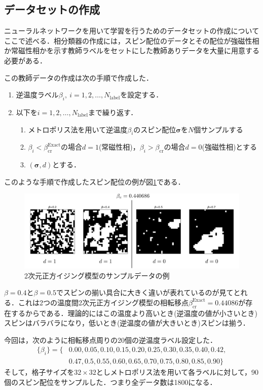 \documentclass[a4paper,11pt]{jsreport}
\begin{document}
\subsection{データセットの作成}
ニューラルネットワークを用いて学習を行うためのデータセットの作成についてここで述べる．相分類器の作成には，スピン配位のデータとその配位が強磁性相か常磁性相かを示す教師ラベルをセットにした教師ありデータを大量に用意する必要がある．\par
この教師データの作成は次の手順で作成した．
\begin{enumerate}
  \item 逆温度ラベル$\beta_i, \ i=1,2,\dots,N_{\text{label}}$を設定する．
  \item 以下を$i=1,2,\dots,N_{\text{label}}$まで繰り返す．
  \begin{enumerate}
    \item メトロポリス法を用いて逆温度$\beta_i$のスピン配位$\bm{\sigma}$を$N$個サンプルする
    \item $\beta_i<\beta_{\text{cr}}^{\text{Exact}}$の場合$d=1$(常磁性相)，$\beta_i>\beta_{\text{cr}}$の場合$d=0$(強磁性相)とする
    \item $(\bm{\sigma},d)$とする．
  \end{enumerate}
\end{enumerate}
このような手順で作成したスピン配位の例が図\ref{相の分類器データセット}である．
\begin{figure}[H]
   \begin{center}
       \includegraphics[width=\linewidth]{image/配位ラベルと相転移ラベル.png}
       \caption{2次元正方イジング模型のサンプルデータの例}
       \label{相の分類器データセット}
   \end{center}
\end{figure}
$\beta=0.4$と$\beta=0.5$でスピンの揃い具合に大きく違いが表れているのが見てとれる．これは2つの温度間2次元正方イジング模型の相転移点$\beta_{\text{cr}}^{\text{Exact}} = 0.44086$が存在するからである．理論的にはこの温度より高いとき(逆温度の値が小さいとき)スピンはバラバラになり，低いとき(逆温度の値が大きいとき)スピンは揃う．\par
今回は，次のように相転移点周りの20個の逆温度ラベル設定した．
\begin{align*}
  \{\beta_i\} 
  = \{ &0.00,0.05,0.10,0.15,0.20,0.25,0.30,0.35,0.40,0.42,\\
  &0.47,0.5,0.55,0.60,0.65,0.70,0.75,0.80,0.85,0.90 \}
\end{align*}
そして，格子サイズを$32 \times 32$としメトロポリス法を用いて各ラベルに対して，90個のスピン配位をサンプルした．つまり全データ数は1800になる．\par
\end{document}
